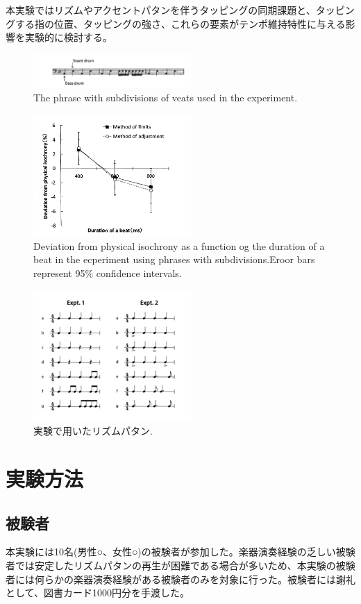 \documentclass[twocolumn,10pt]{jarticle}
\begin{document}
本実験ではリズムやアクセントパタンを伴うタッピングの同期課題と、タッピングする指の位置、タッピングの強さ、これらの要素がテンポ維持特性に与える影響を実験的に検討する。
\begin{figure}
  \centering
  \includegraphics[width=6cm]{Arao_f1.jpg}
  \caption{The phrase with subdivisions of veats used in the experiment.\cite{Arao}}
  \label{Arao_f1}
\end{figure}
\begin{figure}
  \centering
  \includegraphics[width=6cm]{Arao_f2.jpg}
  \caption{Deviation from physical isochrony as a function og the duration of a beat in the ecperiment using phrases with subdivisions.Eroor bars represent 95\% confidence intervals.\cite{Arao}}
  \label{Arao_f2}
\end{figure}
\begin{figure}
  \centering
  \includegraphics[width=6cm]{Nagasima.jpg}
  \caption{実験で用いたリズムパタン.\cite{Nagasima}}
  \label{Nagasima}
\end{figure}
\section{実験方法}
\subsection{被験者}
本実験には10名(男性○、女性○)の被験者が参加した。楽器演奏経験の乏しい被験者では安定したリズムパタンの再生が困難である場合が多いため、本実験の被験者には何らかの楽器演奏経験がある被験者のみを対象に行った。被験者には謝礼として、図書カード1000円分を手渡した。
\end{document}
